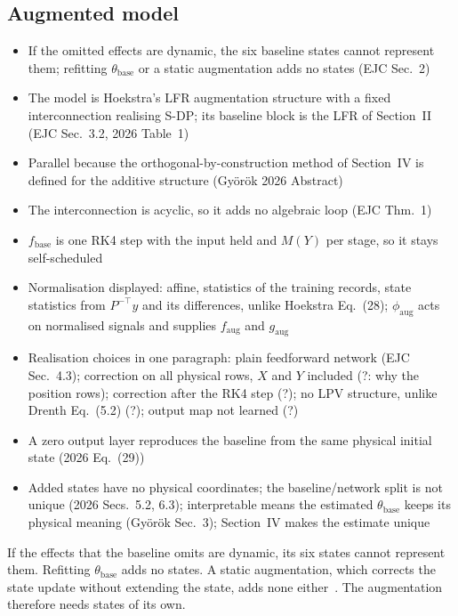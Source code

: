 \subsection{Augmented model}\label{sec:aug_structure}
\ifdraft
\begin{itemize}
\item If the omitted effects are dynamic, the six baseline states cannot represent them; refitting $\theta_{\mathrm{base}}$ or a static augmentation adds no states (EJC Sec.~2)
\item The model is Hoekstra's LFR augmentation structure with a fixed interconnection realising S-DP; its baseline block is the LFR of Section~II (EJC Sec.~3.2, 2026 Table~1)
\item Parallel because the orthogonal-by-construction method of Section~IV is defined for the additive structure (Gy\"or\"ok 2026 Abstract)
\item The interconnection is acyclic, so it adds no algebraic loop (EJC Thm.~1)
\item $f_{\mathrm{base}}$ is one RK4 step with the input held and $M(Y)$ per stage, so it stays self-scheduled
\item Normalisation displayed: affine, statistics of the training records, state statistics from $P^{-\top}y$ and its differences, unlike Hoekstra Eq.~(28); $\phi_{\mathrm{aug}}$ acts on normalised signals and supplies $f_{\mathrm{aug}}$ and $g_{\mathrm{aug}}$
\item Realisation choices in one paragraph: plain feedforward network (EJC Sec.~4.3); correction on all physical rows, $X$ and $Y$ included (?: why the position rows); correction after the RK4 step (?); no LPV structure, unlike Drenth Eq.~(5.2) (?); output map not learned (?)
\item A zero output layer reproduces the baseline from the same physical initial state (2026 Eq.~(29))
\item Added states have no physical coordinates; the baseline/network split is not unique (2026 Secs.~5.2, 6.3); interpretable means the estimated $\theta_{\mathrm{base}}$ keeps its physical meaning (Gy\"or\"ok Sec.~3); Section~IV makes the estimate unique
\end{itemize}
\fi

If the effects that the baseline omits are dynamic, its six states cannot
represent them.
Refitting $\theta_{\mathrm{base}}$ adds no states.
A static augmentation, which corrects the state update without extending the
state, adds none either~\cite[Sec.~2]{hoekstra2025lfr}.
The augmentation therefore needs states of its own.

